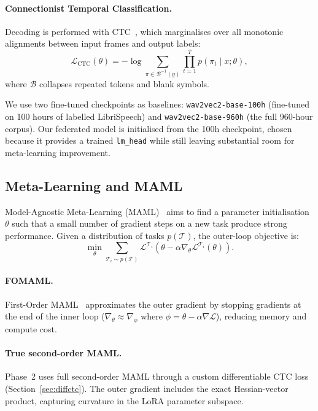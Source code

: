 \documentclass[12pt]{article}
\theoremstyle{plain}
\begin{document}
\paragraph{Connectionist Temporal Classification.}
Decoding is performed with CTC~\cite{graves2006ctc}, which marginalises over all
monotonic alignments between input frames and output labels:
\begin{equation}
  \mathcal{L}_{\mathrm{CTC}}(\theta) =
    -\log \sum_{\pi \in \mathcal{B}^{-1}(y)} \prod_{t=1}^{T} p(\pi_t \mid x;\theta),
\end{equation}
where $\mathcal{B}$ collapses repeated tokens and blank symbols.

We use two fine-tuned checkpoints as baselines:
\texttt{wav2vec2-base-100h} (fine-tuned on 100 hours of labelled LibriSpeech)
and \texttt{wav2vec2-base-960h} (the full 960-hour corpus).
Our federated model is initialised from the 100h checkpoint, chosen because it
provides a trained \texttt{lm\_head} while still leaving substantial room for
meta-learning improvement.

\subsection{Meta-Learning and MAML}

Model-Agnostic Meta-Learning (MAML)~\cite{finn2017maml} aims to find a parameter
initialisation $\theta$ such that a small number of gradient steps on a new
task produce strong performance.
Given a distribution of tasks $p(\mathcal{T})$, the outer-loop objective is:
\begin{equation}
  \min_\theta \sum_{\mathcal{T}_i \sim p(\mathcal{T})}
    \mathcal{L}^{\mathcal{T}_i}\!\left(
      \theta - \alpha \nabla_\theta \mathcal{L}^{\mathcal{T}_i}(\theta)
    \right).
\end{equation}

\paragraph{FOMAML.}
First-Order MAML~\cite{nichol2018fomaml} approximates the outer gradient by
stopping gradients at the end of the inner loop ($\nabla_\theta \approx
\nabla_{\phi}$ where $\phi = \theta - \alpha\nabla\mathcal{L}$),
reducing memory and compute cost.

\paragraph{True second-order MAML.}
Phase~2 uses full second-order MAML through a custom differentiable CTC loss
(Section~\ref{sec:diffctc}).
The outer gradient includes the exact Hessian-vector product, capturing
curvature in the LoRA parameter subspace.
\end{document}
